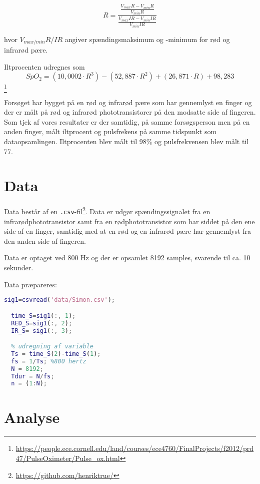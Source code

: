 \documentclass{article}
\begin{document}
\begin{equation}
  \label{eq:1}
  R=\frac{\frac{V_{max}R-V_{min}R}{V_{min}R}}{\frac{V_{max}IR-V_{min}IR}{V_{min}IR}}
\end{equation}

hvor $V_{max/min}R/IR$ angiver spændingsmaksimum og -minimum for rød og infrarød pære.

Iltprocenten udregnes som
\begin{equation}
  \label{eq:2}
  SpO_2=(10,0002\cdot R^3)-(52,887\cdot R^2)+(26,871\cdot R)+98,283
\end{equation}\footnote{\url{https://people.ece.cornell.edu/land/courses/ece4760/FinalProjects/f2012/prd47/PulseOximeter/Pulse_ox.html}}

Forsøget har bygget på en rød og infrarød pære som har gennemlyst en finger og der er målt på rød og infrarød phototransistorer på den modsatte side af fingeren. Som tjek af vores resultater er der samtidig, på samme forsøgsperson men på en anden finger, målt iltprocent og pulsfrekens på samme tidspunkt som dataopsamlingen. Iltprocenten blev målt til 98\% og pulsfrekvensen blev målt til 77.

\section{Data}
\label{sec:data}

Data består af en \lstinline{.csv}-fil\footnote{\url{https://github.com/henriktrue/}}. Data er udgør spændingssignalet fra en infrarødphototransistor samt fra en rødphototransistor som har siddet på den ene side af en finger, samtidig med at en rød og en infrarød pære har gennemlyst fra den anden side af fingeren.

Data er optaget ved 800 Hz og der er opsamlet 8192 samples, svarende til ca. 10 sekunder.

Data præpareres:

\begin{lstlisting}[language=Matlab,basicstyle=\tiny]
  sig1=csvread('data/Simon.csv');

  time_S=sig1(:, 1);
  RED_S=sig1(:, 2);
  IR_S= sig1(:, 3);

  % udregning af variable
  Ts = time_S(2)-time_S(1);
  fs = 1/Ts; %800 hertz
  N = 8192;
  Tdur = N/fs;
  n = (1:N);
\end{lstlisting}


\section{Analyse}
\label{sec:analyse}
\end{document}
